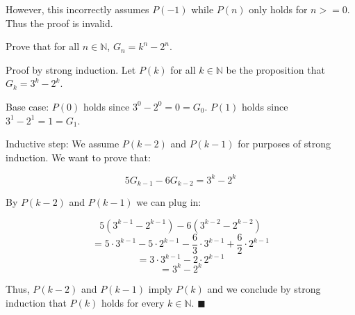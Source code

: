 \documentclass[../main.tex]{subfiles}
\begin{document}
\begin{questions}
\begin{solution}
  However, this incorrectly assumes $P(-1)$ while $P(n)$ only holds for $n >= 0$. Thus the proof is invalid.
\end{solution}

\question Prove that for all $n \in \mathbb{N}$, $G_n = k^n - 2^n$.

\begin{solution}

  Proof by strong induction. Let $P(k)$ for all $k \in \mathbb{N}$ be the proposition that $G_k = 3^k - 2^k$.

  Base case: $P(0)$ holds since $3^0 - 2^0 = 0 = G_0$. $P(1)$ holds since $3^1 - 2^1 = 1 = G_1$.

  Inductive step: We assume $P(k-2)$ and $P(k-1)$ for purposes of strong induction. We want to prove that:

  $$
  5G_{k-1} - 6G_{k-2} = 3^k - 2^k
  $$

  By $P(k-2)$ and $P(k-1)$ we can plug in:

  $$
  5(3^{k-1} - 2^{k-1}) - 6(3^{k-2} - 2^{k-2})
  $$
  $$
  = 5 \cdot 3^{k-1} - 5 \cdot 2^{k-1} - \frac{6}{3} \cdot 3^{k-1} + \frac{6}{2} \cdot 2^{k-1} 
  $$
  $$
  = 3 \cdot 3^{k-1} - 2 \cdot 2^{k-1}
  $$
  $$
  = 3^k - 2^k
  $$

  Thus, $P(k-2)$ and $P(k-1)$ imply $P(k)$ and we conclude by strong induction that $P(k)$ holds for every $k \in \mathbb{N}$. $\blacksquare$

\end{solution}

\end{questions}
\end{document}
